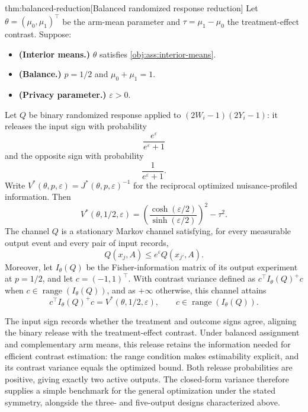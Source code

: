 \begin{theoremv}{thm:balanced-reduction}[Balanced randomized response reduction]
Let \(\theta=(\mu_0,\mu_1)^\top\) be the arm-mean parameter and \(\tau=\mu_1-\mu_0\) the treatment-effect contrast. Suppose:
\begin{itemize}
\item \textbf{(Interior means.)} \(\theta\) satisfies \cref{obj:ass:interior-means}.
\item \textbf{(Balance.)} \(p=1/2\) and \(\mu_0+\mu_1=1\).
\item \textbf{(Privacy parameter.)} \(\varepsilon>0\).
\end{itemize}
Let \(Q\) be binary randomized response applied to \((2W_i-1)(2Y_i-1)\): it releases the input sign with probability
\[
\frac{e^\varepsilon}{e^\varepsilon+1}
\]
and the opposite sign with probability
\[
\frac{1}{e^\varepsilon+1}.
\]
Write \(V^*(\theta,p,\varepsilon)=J^*(\theta,p,\varepsilon)^{-1}\) for the reciprocal optimized nuisance-profiled information. Then
\[
V^*(\theta,1/2,\varepsilon)
=
\left(\frac{\cosh(\varepsilon/2)}{\sinh(\varepsilon/2)}\right)^2-\tau^2.
\]
The channel \(Q\) is a stationary Markov channel satisfying, for every measurable output event and every pair of input records,
\[
Q(x_j,A)\le e^\varepsilon Q(x_{j'},A).
\]
Moreover, let \(I_\theta(Q)\) be the Fisher-information matrix of its output experiment at \(p=1/2\), and let \(c=(-1,1)^\top\). With contrast variance defined as \(c^\top I_\theta(Q)^+c\) when \(c\in\operatorname{range}(I_\theta(Q))\), and as \(+\infty\) otherwise, this channel attains
\[
c^\top I_\theta(Q)^+c=V^*(\theta,1/2,\varepsilon),
\qquad
c\in\operatorname{range}(I_\theta(Q)).
\]
\end{theoremv}

The input sign records whether the treatment and outcome signs agree, aligning the binary release with the treatment-effect contrast. Under balanced assignment and complementary arm means, this release retains the information needed for efficient contrast estimation: the range condition makes estimability explicit, and its contrast variance equals the optimized bound. Both release probabilities are positive, giving exactly two active outputs. The closed-form variance therefore supplies a simple benchmark for the general optimization under the stated symmetry, alongside the three- and five-output designs characterized above.
